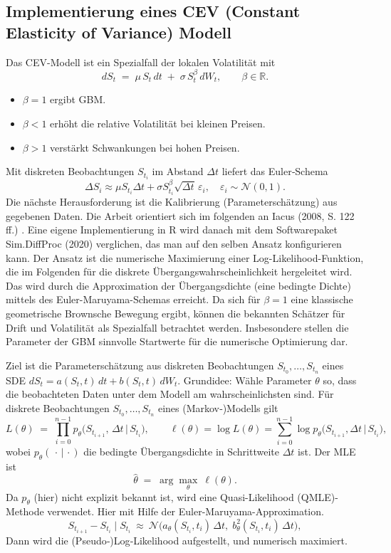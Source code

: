 \subsection{Implementierung eines CEV (Constant Elasticity of Variance) Modell}
Das CEV-Modell ist ein Spezialfall der lokalen Volatilität mit
$$
dS_t \;=\; \mu\,S_t\,dt \;+\; \sigma\,S_t^{\beta}\,dW_t,\qquad \beta\in\mathbb R.
$$
\begin{itemize}
\item $\beta=1$ ergibt GBM. 
\item $\beta<1$ erhöht die relative Volatilität bei kleinen Preisen.
\item $\beta>1$ verstärkt Schwankungen bei hohen Preisen.
\end{itemize}
Mit diskreten Beobachtungen $S_{t_i}$ im Abstand $\Delta t$ liefert das Euler‑Schema
$$
\Delta S_i \approx \mu S_{t_i}\Delta t + \sigma S_{t_i}^{\beta}\sqrt{\Delta t}\,\varepsilon_i,\quad \varepsilon_i\sim\mathcal N(0,1).
$$
Die nächste Herausforderung ist die Kalibrierung (Parameterschätzung) aus gegebenen Daten. Die Arbeit 
orientiert sich im folgenden an Iacus (2008, S. 122 ff.) \cite{iacus2008}. Eine eigene Implementierung in
R wird danach mit dem Softwarepaket Sim.DiffProc \cite{rsde} (2020) verglichen, das man auf den selben Ansatz konfigurieren kann.
Der Ansatz ist die numerische Maximierung einer Log-Likelihood-Funktion, die im Folgenden für die diskrete Übergangswahrscheinlichkeit hergeleitet wird.
Das wird durch die Approximation der Übergangsdichte (eine bedingte Dichte) mittels des Euler-Maruyama-Schemas erreicht. Da sich für $\beta=1$ eine klassische geometrische Brownsche Bewegung ergibt, 
können die bekannten Schätzer für Drift und Volatilität als Spezialfall betrachtet werden. Insbesondere stellen die Parameter der GBM 
sinnvolle Startwerte für die numerische Optimierung dar.

\begin{lemma}
Ziel ist die Parameterschätzung aus diskreten Beobachtungen $S_{t_0},\dots,S_{t_n}$ eines SDE
$dS_t=a(S_t,t)\,dt+b(S_t,t)\,dW_t$. Grundidee: Wähle Parameter $\theta$ so, dass die beobachteten Daten unter dem Modell am wahrscheinlichsten sind. Für diskrete Beobachtungen $S_{t_0},\dots,S_{t_n}$ eines (Markov‑)Modells gilt
$$
L(\theta) \;=\; \prod_{i=0}^{n-1} p_\theta\!\big(S_{t_{i+1}},\,\Delta t \,\big|\, S_{t_i}\big), 
\qquad
\ell(\theta)=\log L(\theta)=\sum_{i=0}^{n-1}\log p_\theta\!\big(S_{t_{i+1}},\Delta t \,\big|\, S_{t_i}\big),
$$
wobei $p_\theta(\,\cdot\,|\,\cdot)$ die bedingte Übergangsdichte in Schrittweite $\Delta t$ ist. Der MLE ist
$$
\widehat\theta\;=\;\arg\max_{\theta}\ \ell(\theta).
$$
Da $p_\theta$ (hier) nicht explizit bekannt ist, wird eine Quasi-Likelihood (QMLE)-Methode verwendet. Hier mit Hilfe der Euler-Maruyama-Approximation.
$$
S_{t_{i+1}}-S_{t_i}\mid S_{t_i}\ \approx\ \mathcal N\!\big(a_\theta(S_{t_i},t_i)\,\Delta t,\; b_\theta^2(S_{t_i},t_i)\,\Delta t\big),
$$
Dann wird die (Pseudo‑)Log‑Likelihood aufgestellt, und numerisch maximiert.
\end{lemma}

